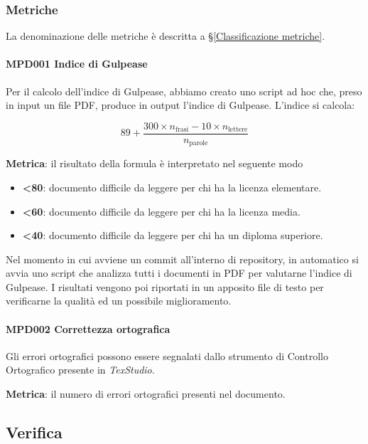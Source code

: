 		\subsubsection{Metriche}
		La denominazione delle metriche è descritta a \S\ref{Classificazione metriche}.
		
			\paragraph{MPD001 Indice di Gulpease}
			Per il calcolo dell'indice di Gulpease, abbiamo creato uno script ad hoc che, preso in input un file PDF, produce in output l'indice di Gulpease.
			L'indice si calcola:
			
			\[89+\dfrac{300\times n_{\text{frasi}}-10\times n_{\text{lettere}}}{n_{\text{parole}}}\]
			
			\textbf{Metrica}: il risultato della formula è interpretato nel seguente modo
			
			\begin{itemize}
				\item \textbf{<80}: documento  difficile da leggere per chi ha la licenza elementare.
				\item \textbf{<60}: documento  difficile da leggere per chi ha la licenza media.
				\item \textbf{<40}: documento difficile da leggere per chi ha un diploma superiore.
			\end{itemize}

			Nel momento in cui avviene un commit all'interno di repository, in automatico si avvia uno script che analizza tutti i documenti in PDF per valutarne
			l'indice di Gulpease. I risultati vengono poi riportati in un apposito file di testo per verificarne la qualità ed un possibile miglioramento.

			\paragraph{MPD002 Correttezza ortografica}
			Gli errori ortografici possono essere segnalati dallo strumento di Controllo Ortografico presente in \textit{TexStudio}.

			\textbf{Metrica}: il numero di errori ortografici presenti nel documento.

	\subsection{Verifica}

